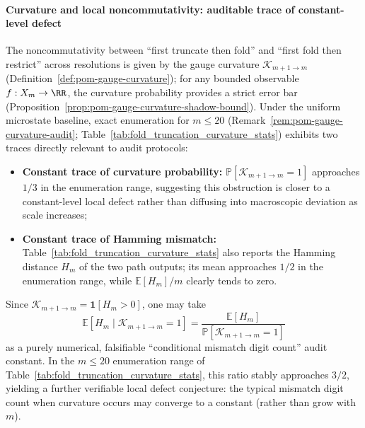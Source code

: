 \paragraph{Curvature and local noncommutativity: auditable trace of constant-level defect}
The noncommutativity between ``first truncate then fold'' and ``first fold then restrict'' across resolutions is given by the gauge curvature
\(\mathcal{K}_{m+1\to m}\) (Definition~\ref{def:pom-gauge-curvature});
for any bounded observable \(f:X_m\to\RR\), the curvature probability provides a strict error bar (Proposition~\ref{prop:pom-gauge-curvature-shadow-bound}).
Under the uniform microstate baseline, exact enumeration for \(m\le 20\) (Remark~\ref{rem:pom-gauge-curvature-audit}; Table~\ref{tab:fold_truncation_curvature_stats}) exhibits two traces directly relevant to audit protocols:
\begin{itemize}
  \item \textbf{Constant trace of curvature probability:} \(\mathbb{P}[\mathcal{K}_{m+1\to m}=1]\) approaches \(1/3\) in the enumeration range, suggesting this obstruction is closer to a constant-level local defect rather than diffusing into macroscopic deviation as scale increases;
  \item \textbf{Constant trace of Hamming mismatch:} Table~\ref{tab:fold_truncation_curvature_stats} also reports the Hamming distance \(H_m\) of the two path outputs; its mean approaches \(1/2\) in the enumeration range, while \(\mathbb{E}[H_m]/m\) clearly tends to zero.
\end{itemize}
Since \(\mathcal{K}_{m+1\to m}=\mathbf 1[H_m>0]\), one may take
\[
\mathbb{E}[H_m\mid \mathcal{K}_{m+1\to m}=1]
=\frac{\mathbb{E}[H_m]}{\mathbb{P}[\mathcal{K}_{m+1\to m}=1]}
\]
as a purely numerical, falsifiable ``conditional mismatch digit count'' audit constant.
In the \(m\le 20\) enumeration range of Table~\ref{tab:fold_truncation_curvature_stats}, this ratio stably approaches \(3/2\), yielding a further verifiable local defect conjecture: the typical mismatch digit count when curvature occurs may converge to a constant (rather than grow with \(m\)).

